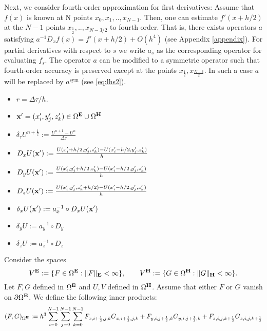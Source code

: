 \documentclass[12pt,reqno]{amsart}
\newcommand{\e}{{\bf E}}
\newcommand{\h}{{\bf H}}
\theoremstyle{definition}
\numberwithin{equation}{section}
\def\Gw{\Omega}     \def\Gx{\Xi}         \def\Gy{\Psi}
\begin{document}
	Next, we consider fourth-order approximation for first derivatives:
	Assume that $f(x)$ is known at N points $x_0,x_1, ..,x_{N-1}$. Then,  one can  estimate  $f'(x+h/2)$ at the $N-1$ points 	$x_{\frac{1}{2}},..,x_{N-3/2}$ to fourth order.
   That is, there exists operators $a$ satisfying $a^{-1}D_xf(x)=f'(x+h/2)+O(h^4)$
   (see Appendix \ref{appendix}). For partial derivatives with respect to $s$ we write $a_s$ as the corresponding operator for evaluating $f_s$. 
   The operator $a$ can be modified to a symmetric operator such that fourth-order accuracy is preserved except at the points $x_{\frac{1}{2}}, x_{\frac{N-3}{2}}$.
   In such a case $a$ will be replaced by $a^{\mathrm{sym}}$ (see \eqref{eq:lhs2}).
	\begin{itemize}
		\item $r=\Delta \tau/h$.
		\item ${\bf x'}=(x_i',y_j',z_k')\in \Gw^\e\cup\Gw^\h$
		\item $\delta_{\tau} U^{n+\frac{1}{2}}:=\frac{U^{n+1}-U^{n}}{\Delta \tau}$
				\item $D_x U({\bf x'}):=\frac{U(x_i'+h/2,y_j',z_k')-U(x_i'-h/2,y_j',z_k')}{h}$
	\item $D_y U({\bf x'}):=\frac{U(x_i',y_j'+h/2,z_k')-U(x_i'-h/2,y_j',z_k')}{h}$
		\item $D_z U({\bf x'}):=\frac{U(x_i',y_j',z_k'+h/2)-U(x_i'-h/2,y_j',z_k')}{h}$
		\item $\delta_x U({\bf x' }):=a_x^{-1}\circ D_xU({\bf x}')$
		\item $\delta_y U:=a_y^{-1}\circ D_y$
		\item 	$\delta_z U:=a_z^{-1}\circ D_z$
	\end{itemize}
		Consider  the spaces 
		$$
		V^{\bf{E}}:=\{F \in \Gw^{\bf{E}}:\|F\|_{\bf{E}}<\infty\}, \qquad 
		V^{\bf{H}}:=\{G \in \Gw^{\bf{H}}:\|G\|_{\bf{H}}<\infty\}.
		$$
		Let $F,G$ defined in $\Gw^{\bf{E}}$ and $U,V$ defined in 
		$\Gw^{\bf{H}}$. Assume that either $F$ or $G$ vanish on $\partial \Gw^\e$.
		We define the following inner products:
		$$
		(F,G)_{\Gw^\e}:=
		h^3\sum_{i=0}^{N-1}\sum_{j=0}^{N-1}\sum_{k=0}^{N-1}
		F_{x,i+\frac{1}{2},j,k}G_{x,i+\frac{1}{2},j,k}+
		F_{y,i,j+\frac{1}{2},k}G_{y,i,j+\frac{1}{2},k}+F_{z,i,j,k+\frac{1}{2}}G_{z,i,j,k+\frac{1}{2}}
		$$
\end{document}
